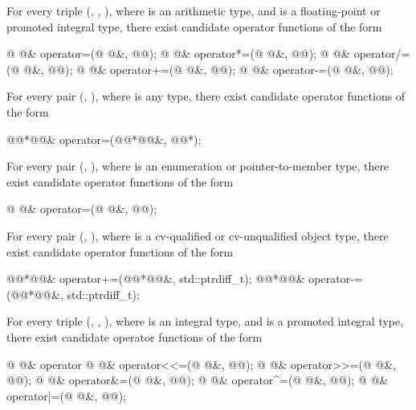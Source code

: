 \pnum
For every triple
(, , ),
where  is an arithmetic type,
and  is a floating-point or promoted integral type,
there exist candidate operator functions of the form
\begin{codeblock}
@ @&   operator=(@ @&, @@);
@ @&   operator*=(@ @&, @@);
@ @&   operator/=(@ @&, @@);
@ @&   operator+=(@ @&, @@);
@ @&   operator-=(@ @&, @@);
\end{codeblock}

\pnum
For every pair (, ),
where  is any type,
there exist candidate operator functions of the form
\begin{codeblock}
@@*@@&   operator=(@@*@@&, @@*);
\end{codeblock}

\pnum
For every pair
(,
),
where
is an enumeration or pointer-to-member type,
there exist candidate operator functions of the form
\begin{codeblock}
@ @&   operator=(@ @&, @@);
\end{codeblock}

\pnum
For every pair
(,
),
where
is a cv-qualified or cv-unqualified object type,
there exist candidate operator functions of the form
\begin{codeblock}
@@*@@&   operator+=(@@*@@&, std::ptrdiff_t);
@@*@@&   operator-=(@@*@@&, std::ptrdiff_t);
\end{codeblock}

\pnum
For every triple
(,
,
),
where
is an integral type, and
is a promoted integral type,
there exist candidate operator functions of the form
\begin{codeblock}
@ @&   operator%
@ @&   operator<<=(@ @&, @@);
@ @&   operator>>=(@ @&, @@);
@ @&   operator&=(@ @&, @@);
@ @&   operator^=(@ @&, @@);
@ @&   operator|=(@ @&, @@);
\end{codeblock}


